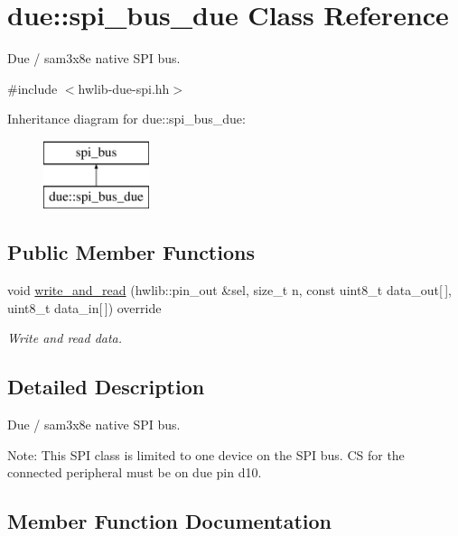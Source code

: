 \hypertarget{classdue_1_1spi__bus__due}{}\section{due\+:\+:spi\+\_\+bus\+\_\+due Class Reference}
\label{classdue_1_1spi__bus__due}


Due / sam3x8e native S\+PI bus.  




{\ttfamily \#include $<$hwlib-\/due-\/spi.\+hh$>$}

Inheritance diagram for due\+:\+:spi\+\_\+bus\+\_\+due\+:\begin{figure}[H]
\begin{center}
\leavevmode
\includegraphics[height=2.000000cm]{classdue_1_1spi__bus__due}
\end{center}
\end{figure}
\subsection*{Public Member Functions}
\begin{DoxyCompactItemize}
\item 
void \hyperlink{classdue_1_1spi__bus__due_ab153084cb35b044537058d15c57a4cb8}{write\+\_\+and\+\_\+read} (hwlib\+::pin\+\_\+out \&sel, size\+\_\+t n, const uint8\+\_\+t data\+\_\+out\mbox{[}$\,$\mbox{]}, uint8\+\_\+t data\+\_\+in\mbox{[}$\,$\mbox{]}) override
\begin{DoxyCompactList}\small\item\em Write and read data. \end{DoxyCompactList}\end{DoxyCompactItemize}


\subsection{Detailed Description}
Due / sam3x8e native S\+PI bus. 

Note\+: This S\+PI class is limited to one device on the S\+PI bus. CS for the connected peripheral must be on due pin d10. 

\subsection{Member Function Documentation}
\mbox{\label{classdue_1_1spi__bus__due_ab153084cb35b044537058d15c57a4cb8}} 
